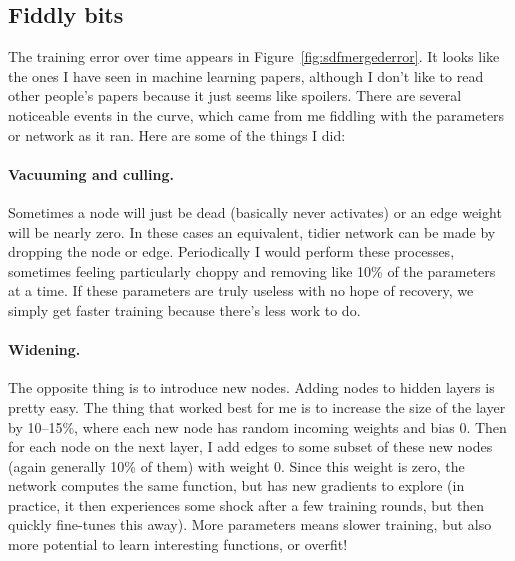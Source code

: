 \documentclass[twocolumn]{article} %
\begin{document}
\subsection{Fiddly bits} \label{sec:fiddly}
The training error over time appears in
Figure~\ref{fig:sdfmergederror}. It looks like the ones I have seen in
machine learning papers, although I don't like to read other people's
papers because it just seems like spoilers. There are several
noticeable events in the curve, which came from me fiddling with the
parameters or network as it ran. Here are some of the things I did:

\paragraph{Vacuuming and culling.} Sometimes a node will just be
dead (basically never activates) or an edge weight will be nearly
zero. In these cases an equivalent, tidier network can be made by
dropping the node or edge. Periodically I would perform these
processes, sometimes feeling particularly choppy and removing like
10\% of the parameters at a time. If these parameters are truly
useless with no hope of recovery, we simply get faster training
because there's less work to do.

\paragraph{Widening.} The opposite thing is to introduce new nodes.
Adding nodes to hidden layers is pretty easy. The thing that worked
best for me is to increase the size of the layer by 10--15\%, where
each new node has random incoming weights and bias 0. Then for each
node on the next layer, I add edges to some subset of these new nodes
(again generally 10\% of them) with weight 0. Since this weight is
zero, the network computes the same function, but has new gradients
to explore (in practice, it then experiences some shock after a
few training rounds, but then quickly fine-tunes this away). More
parameters means slower training, but also more potential to learn
interesting functions, or overfit!
\end{document}
